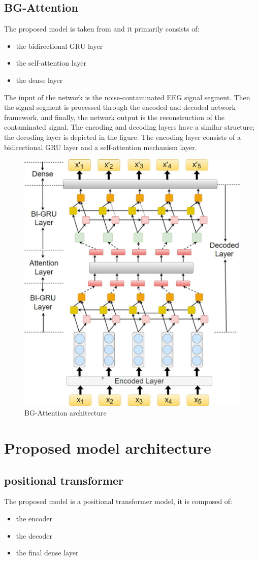 \documentclass[a4paper]{sapthesis}
\begin{document}
\subsection{BG-Attention}\label{sec:model_transformer_gru}
The proposed model is taken from\cite{transformer GRU} and it 
primarily consists of:
\begin{itemize}
  \item the bidirectional GRU layer
  \item the self-attention layer
  \item the dense layer
\end{itemize}
The input of the network is the noise-contaminated EEG signal segment. 
Then the signal segment is processed through the encoded and decoded 
network framework, and finally, the network output is the reconstruction 
of the contaminated signal. The encoding and decoding layers have a 
similar structure; the decoding layer is depicted in the figure. 
The encoding layer consists of a bidirectional GRU layer and a 
self-attention mechanism layer.
\begin{figure}[h!]
\centering
\includegraphics[width=0.6\linewidth]{images/model_architecture_transformer_gru.PNG}
\caption{BG-Attention architecture}
\end{figure}
\section{Proposed model architecture}\label{sec:model_proposed}
\subsection{positional transformer}\label{sec:positional_transformer}
The proposed model is a positional transformer model, it is composed of:
\begin{itemize}
  \item the encoder
  \item the decoder
  \item the final dense layer
  \end{itemize}
  
\end{document}
